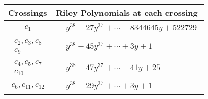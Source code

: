\documentclass[1p]{elsarticle_modified}
\theoremstyle{definition}
\begin{document}
\begin{tabular}{m{50pt}|m{274pt}}
Crossings & \hspace{64pt}Riley Polynomials at each crossing \\
\hline $$\begin{aligned}c_{1}\end{aligned}$$&$\begin{aligned}
&y^{38}-27 y^{37}+\cdots-8344645 y+522729
\end{aligned}$\\
\hline $$\begin{aligned}c_{2},c_{3},c_{8}\\c_{9}\end{aligned}$$&$\begin{aligned}
&y^{38}+45 y^{37}+\cdots+3 y+1
\end{aligned}$\\
\hline $$\begin{aligned}c_{4},c_{5},c_{7}\\c_{10}\end{aligned}$$&$\begin{aligned}
&y^{38}-47 y^{37}+\cdots-41 y+25
\end{aligned}$\\
\hline $$\begin{aligned}c_{6},c_{11},c_{12}\end{aligned}$$&$\begin{aligned}
&y^{38}+29 y^{37}+\cdots+3 y+1
\end{aligned}$\\
\hline
\end{tabular}
\vskip 2pc
\end{document}
